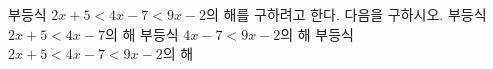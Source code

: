 부등식 $2x+5<4x-7<9x-2$의 해를 구하려고 한다. 다음을 구하시오.
 부등식 $2x+5<4x-7$의 해
 부등식 $4x-7<9x-2$의 해
 부등식 $2x+5<4x-7<9x-2$의 해
